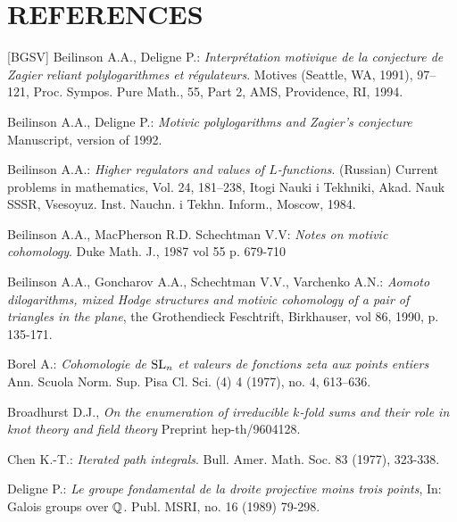 \documentclass[10pt]{article}
\begin{document}
\section*{REFERENCES}
\begin{thebibliography}{[BGSV]}
 Beilinson A.A., Deligne P.: {\it Interpr\'etation motivique de la conjecture de Zagier reliant polylogarithmes et r\'egulateurs}. Motives (Seattle, WA, 1991), 97--121, 
Proc. Sympos. Pure Math., 55, Part 2,
AMS, Providence, RI, 1994.

 Beilinson A.A., Deligne P.: 
{\it Motivic polylogarithms and Zagier's conjecture} 
Manuscript, version of 1992. 

 Beilinson A.A.: {\it Higher regulators and values of $L$-functions}. (Russian) Current problems in mathematics, Vol. 24, 181--238, Itogi
Nauki i Tekhniki, Akad. Nauk SSSR, Vsesoyuz. Inst. Nauchn. i Tekhn. Inform., Moscow, 1984. 

 Beilinson A.A., MacPherson R.D. Schechtman V.V: {\it Notes on motivic cohomology}. Duke Math. J., 1987 vol 55 p. 679-710

 Beilinson A.A., Goncharov A.A., Schechtman V.V., Varchenko A.N.: {\it Aomoto dilogarithms, mixed Hodge structures and motivic cohomology of a pair of triangles in the plane}, the Grothendieck Feschtrift, Birkhauser, vol 86, 1990, p. 135-171.

 Borel A.: {\it Cohomologie de ${\rm SL}\sb{n}$ et valeurs de fonctions zeta aux points entiers} Ann. Scuola Norm. Sup. Pisa Cl.
Sci. (4) 4 (1977), no. 4, 613--636.

 Broadhurst D.J., {\it On the enumeration of irreducible $k$-fold sums and their role in knot theory and field theory} Preprint hep-th/9604128. 

 Chen K.-T.: {\it Iterated path integrals}. 
Bull. Amer. Math. Soc. 83 (1977), 323-338. 

 Deligne P.: {\it Le groupe fondamental de la droite projective moins trois points}, In: Galois groups over ${\mathbb Q}$. Publ. MSRI, no. 16 (1989) 79-298.   


\end{thebibliography}
\end{document}
